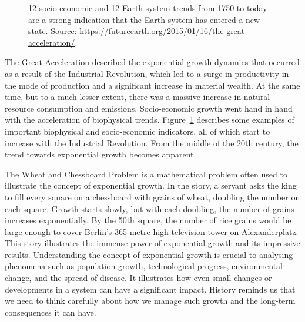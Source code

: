 \documentclass[
  a4paper,
  openany]{book}
\begin{document}
\begin{figure}[H]
\caption{\label{fig-acceleration-trends}12 socio-economic and 12 Earth
system trends from 1750 to today are a strong indication that the Earth
system has entered a new state. Source:
\url{https://futureearth.org/2015/01/16/the-great-acceleration/}.}

\end{figure}%

The Great Acceleration described the exponential growth dynamics that
occurred as a result of the Industrial Revolution, which led to a surge
in productivity in the mode of production and a significant increase in
material wealth. At the same time, but to a much lesser extent, there
was a massive increase in natural resource consumption and emissions.
Socio-economic growth went hand in hand with the acceleration of
biophysical trends. Figure~\ref{fig-acceleration-trends} describes some
examples of important biophysical and socio-economic indicators, all of
which start to increase with the Industrial Revolution. From the middle
of the 20th century, the trend towards exponential growth becomes
apparent.

\begin{tcolorbox}[enhanced jigsaw, left=2mm, arc=.35mm, titlerule=0mm, opacityback=0, leftrule=.75mm, title={The Wheat and Chessboard Problem: an illustration of exponential growth}, breakable, bottomtitle=1mm, rightrule=.15mm, coltitle=black, toptitle=1mm, bottomrule=.15mm, colback=white, opacitybacktitle=0.6, colbacktitle=quarto-callout-tip-color!10!white, toprule=.15mm, colframe=quarto-callout-tip-color-frame]

The Wheat and Chessboard Problem is a mathematical problem often used to
illustrate the concept of exponential growth. In the story, a servant
asks the king to fill every square on a chessboard with grains of wheat,
doubling the number on each square. Growth starts slowly, but with each
doubling, the number of grains increases exponentially. By the 50th
square, the number of rice grains would be large enough to cover
Berlin's 365-metre-high television tower on Alexanderplatz. This story
illustrates the immense power of exponential growth and its impressive
results. Understanding the concept of exponential growth is crucial to
analysing phenomena such as population growth, technological progress,
environmental change, and the spread of disease. It illustrates how even
small changes or developments in a system can have a significant impact.
History reminds us that we need to think carefully about how we manage
such growth and the long-term consequences it can have.

\end{tcolorbox}
\end{document}
